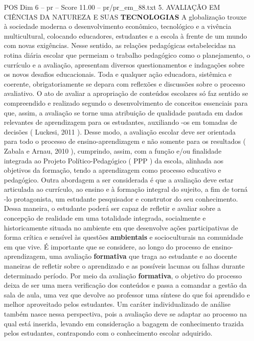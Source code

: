 \begin{textsample}{POS Dim 6 – pr – Score 11.00 – pr/pr\_em\_88.txt}  \label{ex:f6_pos_021}
5.
AVALIAÇÃO EM CIÊNCIAS DA NATUREZA E SUAS \textbf{TECNOLOGIAS} A globalização trouxe à sociedade moderna o desenvolvimento econômico, tecnológico e a vivência multicultural, colocando educadores, estudantes e a escola à frente de um mundo com novas exigências.
Nesse sentido, as relações pedagógicas estabelecidas na rotina diária escolar que permeiam o trabalho pedagógico como o planejamento, o currículo e a avaliação, apresentam diversos questionamentos e indagações sobre os novos desafios educacionais.
Toda e qualquer ação educadora, sistêmica e coerente, obrigatoriamente se depara com reflexões e discussões sobre o processo avaliativo.
O ato de avaliar a apropriação de conteúdos escolares só faz sentido se compreendido e realizado segundo o desenvolvimento de conceitos essenciais para que, assim, a avaliação se torne uma atribuição de qualidade pautada em dados relevantes de aprendizagem para os estudantes, auxiliando -os em tomadas de decisões ( Luckesi, 2011 ).
Desse modo, a avaliação escolar deve ser orientada para todo o processo de ensino-aprendizagem e não somente para os resultados ( Zabala e Arnau, 2010 ), cumprindo, assim, com a função e/ou finalidade integrada ao Projeto Político-Pedagógico ( PPP ) da escola, alinhada aos objetivos da formação, tendo a aprendizagem como processo educativo e pedagógico.
Outra abordagem a ser considerada é que a avaliação deve estar articulada ao currículo, ao ensino e à formação integral do sujeito, a fim de torná -lo protagonista, um estudante pesquisador e construtor do seu conhecimento.
Dessa maneira, o estudante poderá ser capaz de refletir e avaliar sobre a concepção de realidade em uma totalidade integrada, socialmente e historicamente situada no ambiente em que desenvolve ações participativas de forma crítica e sensível às questões \textbf{ambientais} e socioculturais na comunidade em que vive.
É importante que se considere, ao longo do processo de ensino-aprendizagem, uma avaliação \textbf{formativa} que traga ao estudante e ao docente maneiras de refletir sobre o aprendizado e as possíveis lacunas ou falhas durante determinado período.
Por meio da avaliação \textbf{formativa}, o objetivo do processo deixa de ser uma mera verificação dos conteúdos e passa a comandar a gestão da sala de aula, uma vez que devolve ao professor uma síntese do que foi aprendido e melhor aproveitado pelos estudantes.
Um caráter individualizado de análise também nasce nessa perspectiva, pois a avaliação deve se adaptar ao processo na qual está inserida, levando em consideração a bagagem de conhecimento trazida pelos estudantes, contrapondo com o conhecimento escolar adquirido.

\end{textsample}
